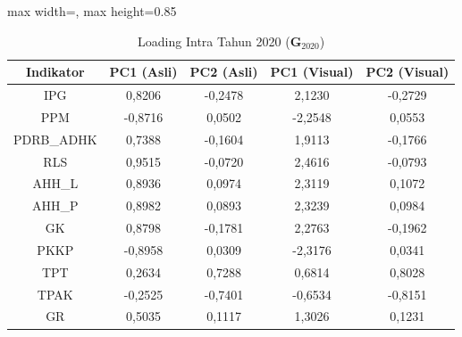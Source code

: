 \begin{table}[H]
\centering
\caption{Loading Intra Tahun 2020 ($\mathbf{G}_{2020}$)} \label{tab:app1loading_intra_2020}
\begin{adjustbox}{max width=\textwidth, max height=0.85\textheight}
\begin{tabular}{|c|c|c|c|c|}
\hline
\textbf{Indikator} & \textbf{PC1 (Asli)} & \textbf{PC2 (Asli)} & \textbf{PC1 (Visual)} & \textbf{PC2 (Visual)} \\
\hline
IPG & 0,8206 & -0,2478 & 2,1230 & -0,2729 \\
PPM & -0,8716 & 0,0502 & -2,2548 & 0,0553 \\
PDRB\_ADHK & 0,7388 & -0,1604 & 1,9113 & -0,1766 \\
RLS & 0,9515 & -0,0720 & 2,4616 & -0,0793 \\
AHH\_L & 0,8936 & 0,0974 & 2,3119 & 0,1072 \\
AHH\_P & 0,8982 & 0,0893 & 2,3239 & 0,0984 \\
GK & 0,8798 & -0,1781 & 2,2763 & -0,1962 \\
PKKP & -0,8958 & 0,0309 & -2,3176 & 0,0341 \\
TPT & 0,2634 & 0,7288 & 0,6814 & 0,8028 \\
TPAK & -0,2525 & -0,7401 & -0,6534 & -0,8151 \\
GR & 0,5035 & 0,1117 & 1,3026 & 0,1231 \\
\hline
\end{tabular}
\end{adjustbox}
\end{table}